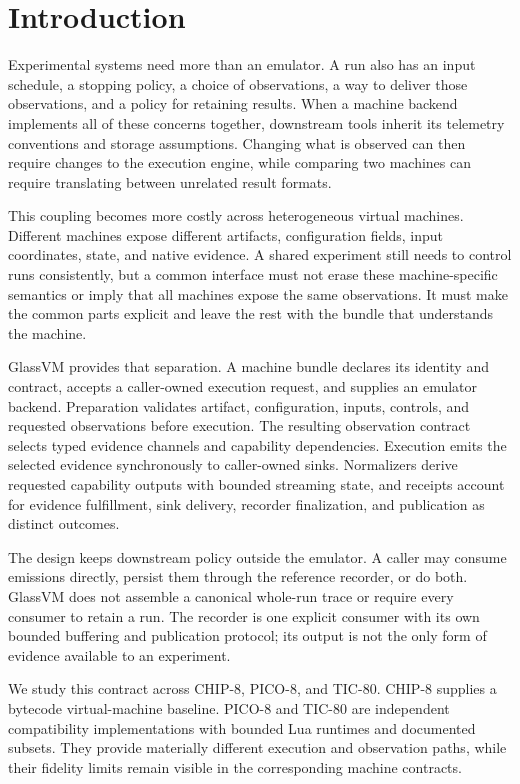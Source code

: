 \section{Introduction}

Experimental systems need more than an emulator. A run also has an input
schedule, a stopping policy, a choice of observations, a way to deliver those
observations, and a policy for retaining results. When a machine backend
implements all of these concerns together, downstream tools inherit its
telemetry conventions and storage assumptions. Changing what is observed can
then require changes to the execution engine, while comparing two machines
can require translating between unrelated result formats.

This coupling becomes more costly across heterogeneous virtual machines.
Different machines expose different artifacts, configuration fields, input
coordinates, state, and native evidence. A shared experiment still needs to
control runs consistently, but a common interface must not erase these
machine-specific semantics or imply that all machines expose the same
observations. It must make the common parts explicit and leave the rest with
the bundle that understands the machine.

GlassVM provides that separation. A machine bundle declares its identity and
contract, accepts a caller-owned execution request, and supplies an emulator
backend. Preparation validates artifact, configuration, inputs, controls,
and requested observations before execution. The resulting observation
contract selects typed evidence channels and capability dependencies.
Execution emits the selected evidence synchronously to caller-owned sinks.
Normalizers derive requested capability outputs with bounded streaming state,
and receipts account for evidence fulfillment, sink delivery, recorder
finalization, and publication as distinct outcomes.

The design keeps downstream policy outside the emulator. A caller may consume
emissions directly, persist them through the reference recorder, or do both.
GlassVM does not assemble a canonical whole-run trace or require every
consumer to retain a run. The recorder is one explicit consumer with its own
bounded buffering and publication protocol; its output is not the only form
of evidence available to an experiment.

We study this contract across CHIP-8, PICO-8, and TIC-80. CHIP-8 supplies a
bytecode virtual-machine baseline. PICO-8 and TIC-80 are independent
compatibility implementations with bounded Lua runtimes and documented
subsets. They provide materially different execution and observation paths,
while their fidelity limits remain visible in the corresponding machine
contracts.

